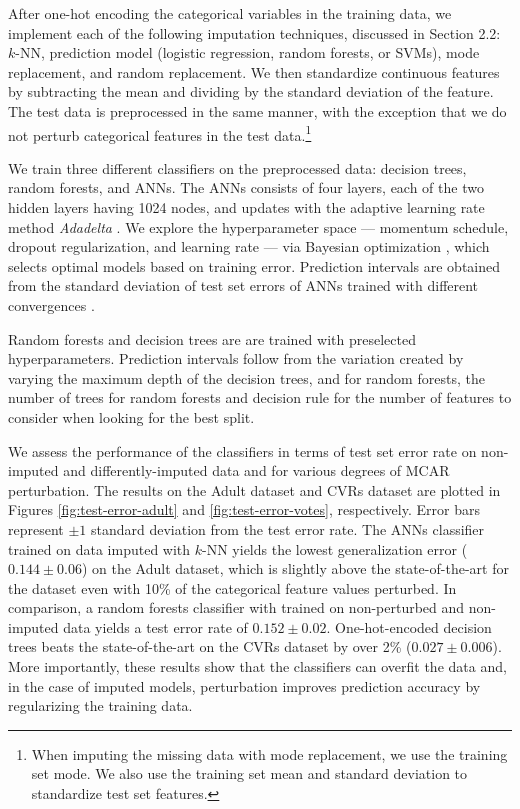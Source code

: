 \documentclass[10pt]{book}
\theoremstyle{definition}
\begin{document}
After one-hot encoding the categorical variables in the training data, we implement each of the following imputation techniques, discussed in Section 2.2: $k$-NN, prediction model (logistic regression, random forests, or SVMs), mode replacement, and random replacement. We then standardize continuous features by subtracting the mean and dividing by the standard deviation of the feature. The test data is preprocessed in the same manner, with the exception that we do not perturb categorical features in the test data.\footnote{When imputing the missing data with mode replacement, we use the training set mode. We also use the training set mean and standard deviation to standardize test set features.\nocite{rubin1995}}

\par
{}

We train three different classifiers on the preprocessed data: decision trees, random forests, and ANNs. The ANNs consists of four layers, each of the two hidden layers having 1024 nodes, and updates with the adaptive learning rate method \emph{Adadelta} \citep{zeiler2012}. We explore the hyperparameter space ---  momentum schedule, dropout regularization, and learning rate --- via Bayesian optimization \citep{snoek2012}, which selects optimal models based on training error. Prediction intervals are obtained from the standard deviation of test set errors of ANNs trained with different convergences \citep{heskes1997}. 

Random forests and decision trees are are trained with preselected hyperparameters. Prediction intervals follow from the variation created by varying the maximum depth of the decision trees, and for random forests, the number of trees for random forests and decision rule for the number of features to consider when looking for the best split. 

\par
{}

We assess the performance of the classifiers in terms of test set error rate on non-imputed and differently-imputed data and for various degrees of MCAR perturbation. The results on the Adult dataset and CVRs dataset are plotted in Figures \ref{fig:test-error-adult} and \ref{fig:test-error-votes}, respectively. Error bars represent $\pm 1$ standard deviation from the test error rate. The ANNs classifier trained on data imputed with $k$-NN yields the lowest generalization error ($0.144 \pm 0.06$) on the Adult dataset, which is slightly above the state-of-the-art for the dataset even with 10\% of the categorical feature values perturbed. In comparison, a random forests classifier with trained on non-perturbed and non-imputed data yields a test error rate of $0.152 \pm 0.02$. One-hot-encoded decision trees beats the state-of-the-art on the CVRs dataset by over 2\% ($0.027 \pm 0.006$). More importantly, these results show that the classifiers can overfit the data and, in the case of imputed models, perturbation improves prediction accuracy by regularizing the training data.
\end{document}

